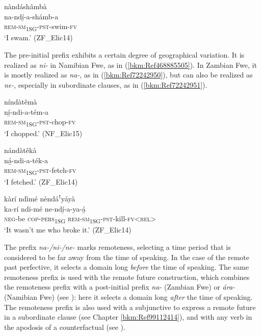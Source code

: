 \ea
\label{bkm:Ref99965736}
\glll nàndáshâmbà\\
na-ndí̲-a-shámb-a\\
\textsc{rem}-\textsc{sm}\textsubscript{1SG}-\textsc{pst}-swim-\textsc{fv}\\
\glt ‘I swam.’ (ZF\_Elic14)
\z

The pre-initial prefix exhibits a certain degree of geographical variation. It is realized as \textit{ni-} in Namibian Fwe, as in (\ref{bkm:Ref468885505}). In Zambian Fwe, it is mostly realized as \textit{na-}, as in (\ref{bkm:Ref72242950}), but can also be realized as \textit{ne-}, especially in subordinate clauses, as in (\ref{bkm:Ref72242951}).

\ea
\label{bkm:Ref468885505}
\glll níndàtêmà\\
ní̲-ndi-a-tém-a\\
\textsc{rem}-\textsc{sm}\textsubscript{1SG}-\textsc{pst}-chop-\textsc{fv}\\
\glt ‘I chopped.’ (NF\_Elic15)
\z

\ea
\label{bkm:Ref72242950}
\glll nándàtêkà\\
ná̲-ndi-a-ték-a\\
\textsc{rem}-\textsc{sm}\textsubscript{1SG}-\textsc{pst}-fetch-\textsc{fv}\\
\glt ‘I fetched.’ (ZF\_Elic14)
\z

\ea
\label{bkm:Ref72242951}
kàrí ndìmé nèndáꜝyáyà\\
\gll ka-rí    ndi-mé  ne-ndí̲-a-ya-á̲\\
\textsc{neg}-be  \textsc{cop}-\textsc{pers}\textsubscript{1SG}  \textsc{rem}-\textsc{sm}\textsubscript{1SG}-\textsc{pst}-kill-\textsc{fv}<\textsc{rel}>\\
\glt ‘It wasn’t me who broke it.’ (ZF\_Elic14)
\z

The prefix \textit{na-/ni-/ne-} marks remoteness, selecting a time period that is considered to be far away from the time of speaking. In the case of the remote past perfective, it selects a domain long \textit{before} the time of speaking. The same remoteness prefix is used with the remote future construction, which combines the remoteness prefix with a post-initial prefix \textit{na-} (Zambian Fwe) or \textit{ára-} (Namibian Fwe) (see ): here it selects a domain long \textit{after} the time of speaking. The remoteness prefix is also used with a subjunctive to express a remote future in a subordinate clause (see Chapter \ref{bkm:Ref99112414}), and with any verb in the apodosis of a counterfactual (see ).

